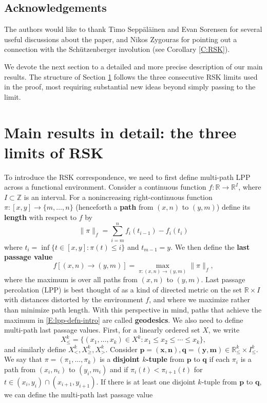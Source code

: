 \documentclass[11pt]{article}
\newcommand{\Z}{\mathbb{Z}}
\newcommand{\R}{\mathbb{R}}
\newcommand{\X}{\times}
\newcommand{\bx}{\mathbf{x}}
\newcommand{\bn}{\mathbf{n}}
\newcommand{\bm}{\mathbf{m}}
\newcommand{\by}{\mathbf{y}}
\newcommand{\bp}{\mathbf{p}}
\newcommand{\bq}{\mathbf{q}}
\theoremstyle{definition} %
\theoremstyle{remark} %
\begin{document}
\subsection*{Acknowledgements} The authors would like to thank Timo Sepp\"al\"ainen and Evan Sorensen for several useful discussions about the paper, and Nikos Zygouras for pointing out a connection with the Sch\"utzenberger involution (see Corollary \ref{C:RSK}).

We devote the next section to a detailed and more precise description of our main results. The structure of Section \ref{S:results} follows the three consecutive RSK limits used in the proof, most  requiring substantial new ideas beyond simply passing to the limit.

\section{Main results in detail: the three limits of RSK}
\label{S:results}
 To introduce the RSK correspondence, we need to first define multi-path LPP across a functional environment. Consider a continuous function $f:\R \to \R^I$, where $I \subset \Z$ is an interval. For a nonincreasing right-continuous function $\pi:[x,y]\to \{m, \dots, n\}$ (henceforth a \textbf{path} from $(x, n)$ to $(y, m)$) define its \textbf{length} with respect to $f$ by
\begin{equation}
	\label{E:pi-f-intro}
	\|\pi\|_f = \sum_{i=m}^n f_i(t_{i-1}) - f_i(t_i)
\end{equation}
where $t_i = \inf \{t \in [x, y] : \pi(t) \le i\}$ and $t_{m-1} = y$. We then define the \textbf{last passage value} 
\begin{equation}
	\label{E:lpp-defn-intro}
	f[(x, n) \to (y, m)] = \max_{\pi:(x, n) \to (y, m)} \|\pi\|_f,
\end{equation}
where the maximum is over all paths from $(x, n)$ to $(y, m)$. Last passage percolation (LPP) is best thought of as a kind of directed metric on the set $\R \X I$ with distances distorted by the environment $f$, and where we maximize rather than minimize path length. With this perspective in mind, paths that achieve the maximum in \eqref{E:lpp-defn-intro} are called \textbf{geodesics}. We also need to define multi-path last passage values. First, for a linearly ordered set $X$, we write 
$$
X^k_\le = \{(x_1, \dots, x_k)\in X^k: x_1 \le x_2 \le \cdots \le x_k\},
$$ 
and similarly define $X^k_<, X^k_\ge, X^k_>$. Consider $\bp = (\bx, \bn), \bq = (\by, \bm) \in \R^k_\le \times I^k_\le$. We say that $\pi = (\pi_1, \dots, \pi_k)$ is a \textbf{disjoint $k$-tuple} from $\bp$ to $\bq$ if each $\pi_i$ is a path from $(x_i, n_i)$ to $(y_i, m_i)$ and if $\pi_i(t) < \pi_{i+1}(t)$ for $t \in (x_i, y_i) \cap (x_{i+1}, y_{i+1})$. If there is at least one disjoint $k$-tuple from $\bp$ to $\bq$, we can define the multi-path last passage value
\end{document}

